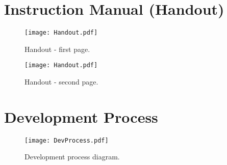 \section{Instruction Manual (Handout)}

\begin{figure}
\centering
\texttt{[image: Handout.pdf]}
\caption{Handout - first page.}
\end{figure}
\begin{figure}
\centering
\texttt{[image: Handout.pdf]}
\caption{Handout - second page.}
\end{figure}

\section{Development Process}

\begin{figure}
\centering
\texttt{[image: DevProcess.pdf]}
\caption{Development process diagram.}
\end{figure}